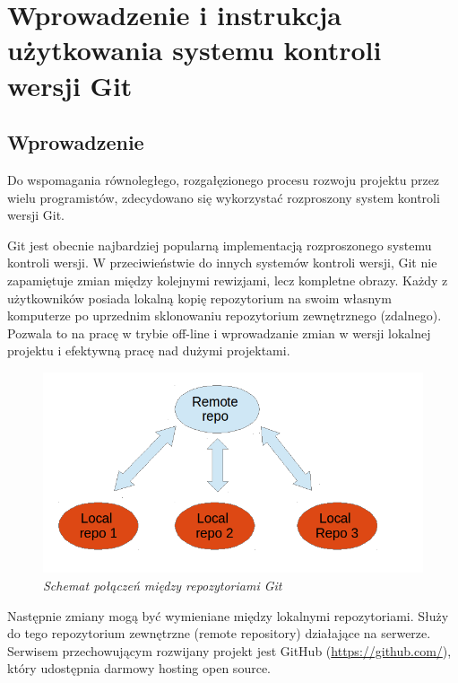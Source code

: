\chapter{Wprowadzenie i instrukcja użytkowania systemu kontroli wersji Git}
\label{ap:1}

\section{Wprowadzenie}

Do wspomagania równoległego, rozgałęzionego procesu rozwoju projektu przez wielu programistów, zdecydowano się wykorzystać rozproszony system kontroli wersji Git. 

	Git jest obecnie najbardziej popularną implementacją rozproszonego systemu kontroli wersji. W przeciwieństwie do innych systemów kontroli wersji, Git nie zapamiętuje zmian między kolejnymi rewizjami, lecz kompletne obrazy. Każdy z użytkowników posiada lokalną kopię repozytorium na swoim własnym komputerze po uprzednim sklonowaniu repozytorium zewnętrznego (zdalnego).  Pozwala to na pracę w trybie off-line i wprowadzanie zmian w wersji lokalnej projektu i efektywną pracę nad dużymi projektami.
	
\begin{figure}[!h]
    \begin{center}
    \includegraphics[angle=0,scale=0.5]{img/repo.png}
    \end{center}
    \caption{\em Schemat połączeń między repozytoriami Git}
    \label{fig:repo}
\end{figure}

Następnie zmiany mogą być wymieniane między lokalnymi repozytoriami. Służy do tego repozytorium zewnętrzne (remote repository) działające na serwerze. Serwisem przechowującym rozwijany projekt jest GitHub (\url{https://github.com/}), który udostępnia darmowy hosting open source. 


